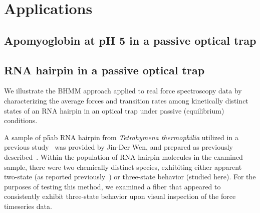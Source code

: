 \documentclass[aps,pre,twocolumn,superscriptaddress,nofootinbib,longbibliography]{revtex4-1}
\begin{document}
{%
\section{Applications}
\label{section:application}

\subsection{Apomyoglobin at pH 5 in a passive optical trap}
\label{section:application-apomyoglobin}

{\color{red}{\bf [JDC: This section remains to be completed.]}}

\subsection{RNA hairpin in a passive optical trap}
\label{section:application-rna-hairpin}

We illustrate the BHMM approach applied to real force spectroscopy data by characterizing the average forces and transition rates among kinetically distinct states of {\color{red} an} RNA hairpin in an optical trap under passive (equilibrium) conditions.

\color{red}
A sample of p5ab RNA hairpin from \emph{Tetrahymena thermophilia} utilized in a previous study~\cite{wen-manosas:biophys-j:2007:rna-optical-tweezers} was provided by Jin-Der Wen, and prepared as previously described~\cite{wen-manosas:biophys-j:2007:rna-optical-tweezers}.  
Within the population of RNA hairpin molecules in the examined sample, there were two chemically distinct species, exhibiting either apparent two-state (as reported previously~\cite{wen-manosas:biophys-j:2007:rna-optical-tweezers}) or three-state behavior (studied here).  
For the purposes of testing this method, we examined a fiber that appeared to consistently exhibit three-state behavior upon visual inspection of the force timeseries data. 

}
\end{document}
